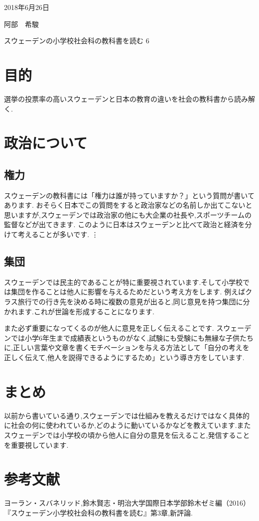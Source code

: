 \documentclass[a4j,10pt]{jsarticle}
\begin{document}
\begin{flushright} %
2018年6月26日

阿部　希駿
\end{flushright}

\begin{center}
\Large{スウェーデンの小学校社会科の教科書を読む 6}
\end{center}

\section{目的}
\label{sec:kihon}
選挙の投票率の高いスウェーデンと日本の教育の違いを社会の教科書から読み解く.

\section{政治について}
\subsection{権力}
スウェーデンの教科書には「権力は誰が持っていますか？」という質問が書いてあります.
おそらく日本でこの質問をすると政治家などの名前しか出てこないと思いますが,スウェーデンでは政治家の他にも大企業の社長や,スポーツチームの監督などが出てきます.
このように日本はスウェーデンと比べて政治と経済を分けて考えることが多いです.
\vdots

\subsection{集団}
スウェーデンでは民主的であることが特に重要視されています.そして小学校では集団を作ることは他人に影響を与えるためだという考え方をします.
例えばクラス旅行での行き先を決める時に複数の意見が出ると,同じ意見を持つ集団に分かれます.これが世論を形成することになります.

また必ず重要になってくるのが他人に意見を正しく伝えることです.
スウェーデンでは小学6年生まで成績表というものがなく,試験にも受験にも無縁な子供たちに,正しい言葉や文章を書くモチベーションを与える方法として「自分の考えを正しく伝えて,他人を説得できるようにするため」という導き方をしています.


\section{まとめ}
\label{sec:kihon}
以前から書いている通り,スウェーデンでは仕組みを教えるだけではなく具体的に社会の何に使われているか,どのように動いているかなどを教えています.またスウェーデンでは小学校の頃から他人に自分の意見を伝えること,発信することを重要視しています.

\section{参考文献}
\label{sec:kihon}
ヨーラン・スバネリッド,鈴木賢志・明治大学国際日本学部鈴木ゼミ編（2016）『スウェーデン小学校社会科の教科書を読む』第3章,新評論.
  
\end{document}
